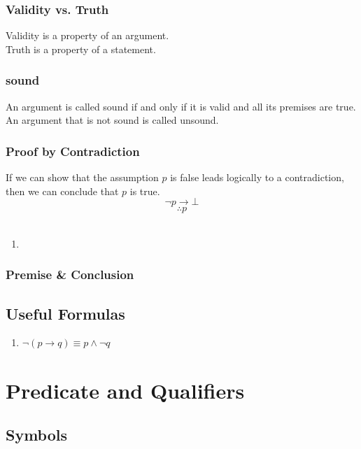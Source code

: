 \documentclass[12pt]{book}
\newcommand{\F}[0]{\bot}
\begin{document}
\subsubsection{Validity vs. Truth}
Validity is a property of an argument.\\
Truth is a property of a statement.
\subsubsection{sound}
An argument is called sound if and only if it is valid and all its premises are true. An argument that is not sound is called unsound. 
\subsubsection{Proof by Contradiction}
If we can show that the assumption $p$ is false leads logically to a contradiction, then we can conclude that $p$ is true. 
\[
\neg p \rightarrow \F
\]
\[
\therefore p
\]\\
\begin{enumerate}
    \item 
\end{enumerate}

\subsubsection{Premise \& Conclusion}


\subsection{Useful Formulas}
    \begin{enumerate}
        \item $\neg (p \rightarrow q) \equiv p \wedge \neg q$
    \end{enumerate}




\section{Predicate and Qualifiers}
\subsection{Symbols}
\end{document}
